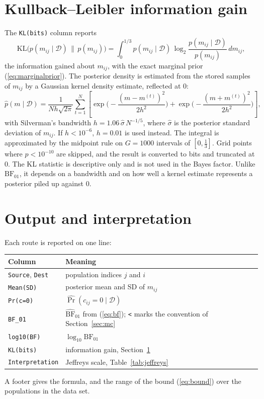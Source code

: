 \documentclass[11pt,a4paper]{article}
\newcommand{\KL}{\mathrm{KL}}
\newcommand{\BF}{\mathrm{BF}}
\newcommand{\data}{\mathcal{D}}
\newcommand{\1}{\mathbf{1}}
\begin{document}
\section{Kullback--Leibler information gain}
\label{sec:kl}

The \texttt{KL(bits)} column reports
\[
\KL\big(p(m_{ij}\mid\data)\,\|\,p(m_{ij})\big)
= \int_0^{1/3} p(m_{ij}\mid\data)\,\log_2\frac{p(m_{ij}\mid\data)}{p(m_{ij})}\,dm_{ij},
\]
the information gained about $m_{ij}$, with the exact marginal prior
(\ref{eq:marginalprior}). The posterior density is estimated from the stored
samples of $m_{ij}$ by a Gaussian kernel density estimate, reflected at $0$:
\[
\hat p(m\mid\data) = \frac{1}{Nh\sqrt{2\pi}}\sum_{t=1}^N
\left[\exp\!\Big(-\frac{(m-m^{(t)})^2}{2h^2}\Big) + \exp\!\Big(-\frac{(m+m^{(t)})^2}{2h^2}\Big)\right],
\]
with Silverman's bandwidth $h = 1.06\,\hat\sigma\,N^{-1/5}$, where
$\hat\sigma$ is the posterior standard deviation of $m_{ij}$. If $h<10^{-6}$,
$h=0.01$ is used instead. The integral is approximated by the midpoint rule on
$G=1000$ intervals of $[0,\frac13]$. Grid points where
$\hat p < 10^{-10}$ are skipped, and the result is converted to bits and
truncated at $0$. The KL statistic is descriptive only and is not used in the
Bayes factor. Unlike $\BF_{01}$, it depends on a bandwidth and on how well a
kernel estimate represents a posterior piled up against $0$.

\section{Output and interpretation}
\label{sec:output}

Each route is reported on one line:
\begin{center}
\small
\begin{tabular}{ll}
\toprule
Column & Meaning \\
\midrule
\texttt{Source}, \texttt{Dest} & population indices $j$ and $i$ \\
\texttt{Mean(SD)} & posterior mean and SD of $m_{ij}$ \\
\texttt{Pr(c=0)} & $\widehat{\Pr}(c_{ij}=0\mid\data)$ \\
\texttt{BF\_01} & $\widehat{\BF}_{01}$ from (\ref{eq:bf}); \texttt{<} marks the convention of Section~\ref{sec:mc} \\
\texttt{log10(BF)} & $\log_{10}\widehat{\BF}_{01}$ \\
\texttt{KL(bits)} & information gain, Section~\ref{sec:kl} \\
\texttt{Interpretation} & Jeffreys scale, Table~\ref{tab:jeffreys} \\
\bottomrule
\end{tabular}
\end{center}
A footer gives the formula, and the range of the bound (\ref{eq:bound}) over the
populations in the data set.
\end{document}
